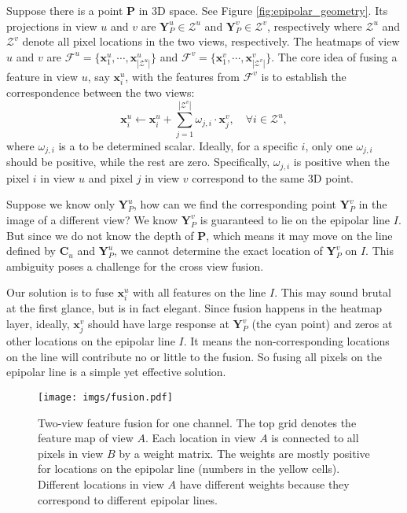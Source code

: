 \documentclass[10pt,twocolumn,letterpaper]{article}
\begin{document}
Suppose there is a point $\bm{P}$ in $3$D space. See Figure \ref{fig:epipolar_geometry}. Its projections in view $u$ and $v$ are $\bm{Y}_P^u \in \mathcal{Z}^u$ and $\bm{Y}_P^v \in \mathcal{Z}^v$, respectively where $\mathcal{Z}^u$ and $\mathcal{Z}^v$ denote all pixel locations in the two views, respectively. The heatmaps of view $u$ and $v$ are $\mathcal{F}^u=\{\bm{x}_1^u, \cdots, \bm{x}_{|\mathcal{Z}^u|}^u\}$ and $\mathcal{F}^v=\{\bm{x}_1^v, \cdots, \bm{x}_{|\mathcal{Z}^v|}^v\}$. The core idea of fusing a feature in view $u$, say $\bm{x}_i^u$, with the features from $\mathcal{F}^v$ is to establish the correspondence between the two views:
\begin{equation}
    \bm{x}_i^u \leftarrow \bm{x}_i^u + \sum_{j=1}^{|\mathcal{Z}^v|}{\omega_{j,i} \cdot \bm{x}_j^v}, \quad \forall i \in \mathcal{Z}^u,
    \label{eq:update_rule}
\end{equation}
where $\omega_{j,i}$ is a to be determined scalar. Ideally, for a specific $i$, only one $\omega_{j,i}$ should be positive, while the rest are zero. Specifically, $\omega_{j,i}$ is positive when the pixel $i$ in view $u$ and pixel $j$ in view $v$ correspond to the same $3$D point.

Suppose we know only $\bm{Y}_P^u$, how can we find the corresponding point $\bm{Y}_P^v$ in the image of a different view? We know $\bm{Y}_P^v$ is guaranteed to lie on the epipolar line $I$. But since we do not know the depth of $\bm{P}$, which means it may move on the line defined by $\bm{C}_u$ and $\bm{Y}_P^u$, we cannot determine the exact location of $\bm{Y}_P^v$ on $I$. This ambiguity poses a challenge for the cross view fusion.

Our solution is to fuse $\bm{x}_i^u$ with all features on the line $I$. This may sound brutal at the first glance, but is in fact elegant. Since fusion happens in the heatmap layer, ideally, $\bm{x}_j^v$ should have large response at $\bm{Y}_P^v$ (the cyan point) and zeros at other locations on the epipolar line $I$. It means the non-corresponding locations on the line will contribute no or little to the fusion. So fusing all pixels on the epipolar line is a simple yet effective solution. 


\begin{figure}
	\centering
	\texttt{[image: imgs/fusion.pdf]}
	\caption{Two-view feature fusion for one channel. The top grid denotes the feature map of view $A$. Each location in view $A$ is connected to all pixels in view $B$ by a weight matrix. The weights are mostly positive for locations on the epipolar line (numbers in the yellow cells). Different locations in view $A$ have different weights because they correspond to different epipolar lines.}
	\label{fig:feature_fusion}
\end{figure}
\end{document}

